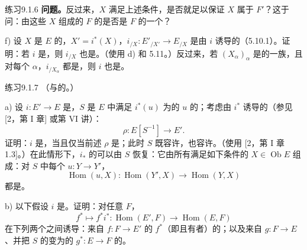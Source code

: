 \begin{SGAresult}{练习}{9.1.6}
\textbf{问题。}反过来，$X$ 满足上述条件，是否就足以保证 $X$ 属于 $F'$？这于问：由这些 $X$ 组成的 $F$ 的是否是 $F$ 的一个？

f) 设 $X$ 是 $E$ 的，$X'=i^*(X)$，$i_{/X}:E'_{/X'}\to E_{/X}$ 是由 $i$ 诱导的（5.10.1）。证明：若 $i$ 是，则 $i_{/X}$ 也是。（使用 d) 和 5.11。）反过来，若 $(X_\alpha)_\alpha$ 是的一族，且对每个 $\alpha$，$i_{/X_\alpha}$ 都是，则 $i$ 也是。
\end{SGAresult}
\begin{SGAresult}{练习}{9.1.7}
（与的。）

a) 设 $i:E'\to E$ 是，$S$ 是 $E$ 中满足 $i^*(u)$ 为的 $u$ 的；考虑由 $i^*$ 诱导的（参见 [2，第 I 章] 或第 VI 讲）：
\[
\rho:E[S^{-1}]\longrightarrow E'.\tag{9.1.7.1}
\]
证明：$i$ 是，当且仅当前述 $\rho$ 是；此时 $S$ 既容许，也容许。（使用 [2，第 I 章 1.3]。）在此情形下，$i_*$ 的可以由 $S$ 恢复：它由所有满足如下条件的 $X\in\operatorname{Ob}E$ 组成：对 $S$ 中每个 $u:Y\to Y'$，
\[
\operatorname{Hom}(u,X):\operatorname{Hom}(Y',X)\longrightarrow\operatorname{Hom}(Y,X)
\]
都是。

b) 以下假设 $i$ 是。证明：对任意 $F$，
\[
f^*\longmapsto f^*i^*:\operatorname{Hom}(E',F)\longrightarrow\operatorname{Hom}(E,F)
\]
在下列两个之间诱导：来自 $f:F\to E'$ 的 $f^*$（即且有者）的；以及来自 $g:F\to E$、并把 $S$ 的变为的 $g^*:E\to F$ 的。


\end{SGAresult}
